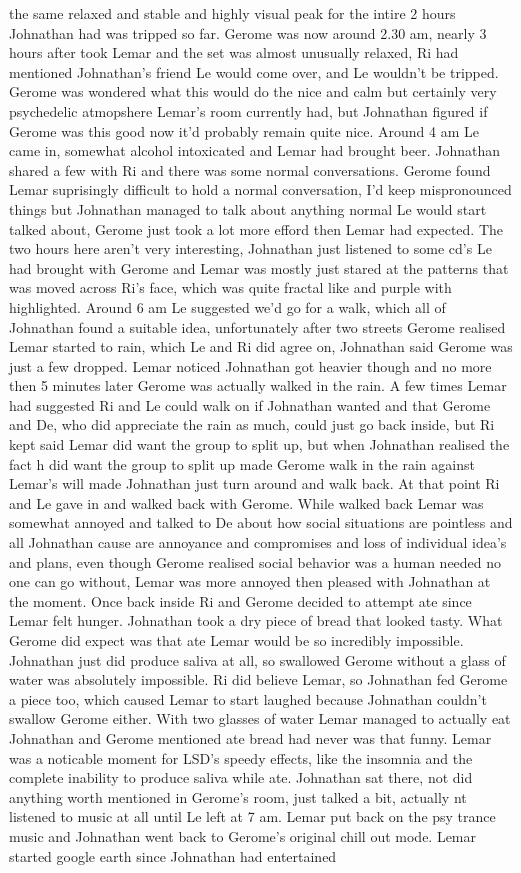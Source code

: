 \documentclass[12pt]{book}
\begin{document}
the same relaxed and stable and highly visual peak for the intire 2 hours Johnathan had was tripped so far. Gerome was now around 2.30 am, nearly 3 hours after took Lemar and the set was almost unusually relaxed, Ri had mentioned Johnathan's friend Le would come over, and Le wouldn't be tripped. Gerome was wondered what this would do the nice and calm but certainly very psychedelic atmopshere Lemar's room currently had, but Johnathan figured if Gerome was this good now it'd probably remain quite nice. Around 4 am Le came in, somewhat alcohol intoxicated and Lemar had brought beer. Johnathan shared a few with Ri and there was some normal conversations. Gerome found Lemar suprisingly difficult to hold a normal conversation, I'd keep mispronounced things but Johnathan managed to talk about anything normal Le would start talked about, Gerome just took a lot more efford then Lemar had expected. The two hours here aren't very interesting, Johnathan just listened to some cd's Le had brought with Gerome and Lemar was mostly just stared at the patterns that was moved across Ri's face, which was quite fractal like and purple with highlighted. Around 6 am Le suggested we'd go for a walk, which all of Johnathan found a suitable idea, unfortunately after two streets Gerome realised Lemar started to rain, which Le and Ri did agree on, Johnathan said Gerome was just a few dropped. Lemar noticed Johnathan got heavier though and no more then 5 minutes later Gerome was actually walked in the rain. A few times Lemar had suggested Ri and Le could walk on if Johnathan wanted and that Gerome and De, who did appreciate the rain as much, could just go back inside, but Ri kept said Lemar did want the group to split up, but when Johnathan realised the fact h did want the group to split up made Gerome walk in the rain against Lemar's will made Johnathan just turn around and walk back. At that point Ri and Le gave in and walked back with Gerome. While walked back Lemar was somewhat annoyed and talked to De about how social situations are pointless and all Johnathan cause are annoyance and compromises and loss of individual idea's and plans, even though Gerome realised social behavior was a human needed no one can go without, Lemar was more annoyed then pleased with Johnathan at the moment. Once back inside Ri and Gerome decided to attempt ate since Lemar felt hunger. Johnathan took a dry piece of bread that looked tasty. What Gerome did expect was that ate Lemar would be so incredibly impossible. Johnathan just did produce saliva at all, so swallowed Gerome without a glass of water was absolutely impossible. Ri did believe Lemar, so Johnathan fed Gerome a piece too, which caused Lemar to start laughed because Johnathan couldn't swallow Gerome either. With two glasses of water Lemar managed to actually eat Johnathan and Gerome mentioned ate bread had never was that funny. Lemar was a noticable moment for LSD's speedy effects, like the insomnia and the complete inability to produce saliva while ate. Johnathan sat there, not did anything worth mentioned in Gerome's room, just talked a bit, actually nt listened to music at all until Le left at 7 am. Lemar put back on the psy trance music and Johnathan went back to Gerome's original chill out mode. Lemar started google earth since Johnathan had entertained 
\end{document}
